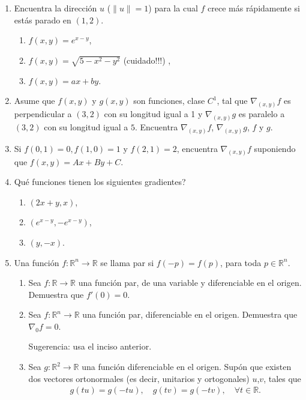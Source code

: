 \documentclass{article}
\theoremstyle{definition}
\begin{document}
\begin{enumerate}
\item Encuentra la direcci\'on $u$ ($\|u\|=1$) para la cual $f$ crece m\'as r\'apidamente
  si est\'as parado en $(1,2)$.
  \begin{enumerate}
  \item $f(x,y)=e^{x-y}$,
  \item $f(x,y)=\sqrt{5-x^2-y^2}$ (cuidado!!!) ,
  \item $f(x,y)=ax+by$.
  \end{enumerate}


\item Asume que $f(x,y)$ y $g(x,y)$ son   funciones, clase $C^1$, tal que
  $\nabla_{(x,y)} f$ es perpendicular a $(3,2)$ con su longitud
  igual a 1 y $\nabla_{(x,y)}g$ es paralelo a $(3,2)$
  con su longitud igual a $5$. Encuentra $\nabla_{(x,y)}f$,
  $\nabla_{(x,y)}g$, $f$ y $g$.

\item Si $f(0,1)=0, f(1,0)=1$ y $f(2,1)=2$, encuentra
  $\nabla_{(x,y)}f$ suponiendo que $f(x,y)=Ax+By+C$.

\item \textquestiondown Qu\'e funciones tienen los siguientes
  gradientes?
  \begin{enumerate}
  \item $(2x+y,x)$,
  \item $(e^{x-y},-e^{x-y})$,
  \item $(y,-x)$.
    
  \end{enumerate}
  


         \item Una funci\'on $f:\mathbb{R}^n \to \mathbb{R}$ se llama par si
           $f(-p)=f(p)$, para toda $p\in \mathbb{R}^n$.

           \begin{enumerate}
         
           \item Sea $f:\mathbb{R} \to \mathbb{R}$ una funci\'on par, de una variable
             y diferenciable en el origen. Demuestra que $f'(0)=0$. 


           \item Sea $f:\mathbb{R}^n \to \mathbb{R}$ una funci\'on par,
             diferenciable en el origen. Demuestra que $\nabla_{0}f=0$.

             Sugerencia: usa el inciso anterior.
             
           \item Sea $g:\mathbb{R}^2\to \mathbb{R}$ una funci\'on diferenciable en
             el origen. Sup\'on que existen dos vectores ortonormales (es decir,
             unitarios y ortogonales) $u$,$v$, tales que
             \begin{eqnarray*}
               g(tu)=g(-tu), \quad g(tv)=g(-tv),\quad \forall t\in \mathbb{R}. 
             \end{eqnarray*}


\end{enumerate}
\end{enumerate}
\end{document}
